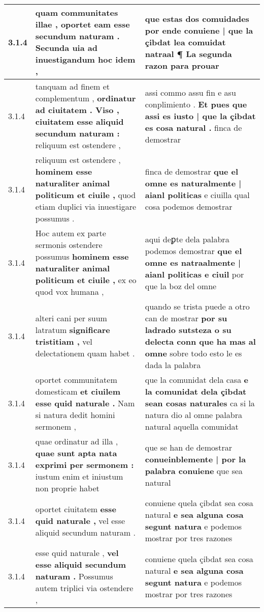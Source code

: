 \begin{tabular}{|p{1cm}|p{6.5cm}|p{6.5cm}|}
3.1.4 & quam communitates illae , \textbf{ oportet eam esse secundum naturam . } Secunda uia ad inuestigandum hoc idem , & que estas dos comuidades \textbf{ por ende conuiene | que la çibdat lea comuidat natraal ¶ } La segunda razon para prouar \\\hline
3.1.4 & tanquam ad finem et complementum , \textbf{ ordinatur ad ciuitatem . Viso , ciuitatem esse aliquid secundum naturam : } reliquum est ostendere , & assi commo assu fin e asu conplimiento . \textbf{ Et pues que assi es iusto | que la çibdat es cosa natural . } finca de demostrar \\\hline
3.1.4 & reliquum est ostendere , \textbf{ hominem esse naturaliter animal politicum et ciuile , } quod etiam duplici via inuestigare possumus . & finca de demostrar \textbf{ que el omne es naturalmente | aianl politicas } e ciuilla qual cosa podemos demostrar \\\hline
3.1.4 & Hoc autem ex parte sermonis ostendere possumus \textbf{ hominem esse naturaliter animal politicum et ciuile , } ex eo quod vox humana , & aqui deꝑte dela palabra podemos demostrar \textbf{ que el omne es natraalmente | aianl politicas e ciuil } por que la boz del omne \\\hline
3.1.4 & alteri cani per suum latratum \textbf{ significare tristitiam , } vel delectationem quam habet . & quando se trista puede a otro can de mostrar \textbf{ por su ladrado sutsteza o su delecta conn que ha mas al omne } sobre todo esto le es dada la palabra \\\hline
3.1.4 & oportet communitatem domesticam \textbf{ et ciuilem esse quid naturale . } Nam si natura dedit homini sermonem , & que la comunidat dela casa \textbf{ e la comunidat dela çibdat sean cosas naturales } ca si la natura dio al omne palabra natural aquella comunidat \\\hline
3.1.4 & quae ordinatur ad illa , \textbf{ quae sunt apta nata exprimi per sermonem : } iustum enim et iniustum non proprie habet & que se han de demostrar \textbf{ conueinblemente | por la palabra conuiene } que sea natural \\\hline
3.1.4 & oportet ciuitatem \textbf{ esse quid naturale , } vel esse aliquid secundum naturam . & conuiene quela çibdat sea cosa natural \textbf{ e sea alguna cosa segunt natura } e podemos mostrar por tres razones \\\hline
3.1.4 & esse quid naturale , \textbf{ vel esse aliquid secundum naturam . } Possumus autem triplici via ostendere , & conuiene quela çibdat sea cosa natural \textbf{ e sea alguna cosa segunt natura } e podemos mostrar por tres razones \\\hline

\end{tabular}
